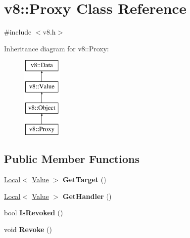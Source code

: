 \hypertarget{classv8_1_1Proxy}{}\section{v8\+:\+:Proxy Class Reference}
\label{classv8_1_1Proxy}


{\ttfamily \#include $<$v8.\+h$>$}

Inheritance diagram for v8\+:\+:Proxy\+:\begin{figure}[H]
\begin{center}
\leavevmode
\includegraphics[height=4.000000cm]{classv8_1_1Proxy}
\end{center}
\end{figure}
\subsection*{Public Member Functions}
\begin{DoxyCompactItemize}
\item 
\mbox{\label{classv8_1_1Proxy_a40f69bf7f06663ddbadde418e2b73a25}} 
\mbox{\hyperlink{classv8_1_1Local}{Local}}$<$ \mbox{\hyperlink{classv8_1_1Value}{Value}} $>$ {\bfseries Get\+Target} ()
\item 
\mbox{\label{classv8_1_1Proxy_a19abaf64953263b26f81191eec00e5f5}} 
\mbox{\hyperlink{classv8_1_1Local}{Local}}$<$ \mbox{\hyperlink{classv8_1_1Value}{Value}} $>$ {\bfseries Get\+Handler} ()
\item 
\mbox{\label{classv8_1_1Proxy_ad6100ff322bd5b0297deea20237ff065}} 
bool {\bfseries Is\+Revoked} ()
\item 
\mbox{\label{classv8_1_1Proxy_a24a05c4dc89a74406456df8c14adff7e}} 
void {\bfseries Revoke} ()
\end{DoxyCompactItemize}
